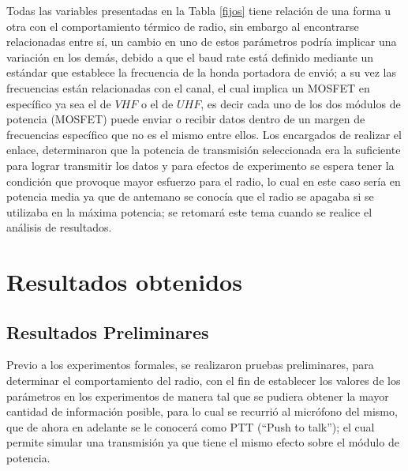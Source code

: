 Todas las variables presentadas en la Tabla \ref{fijos} tiene relación de una forma u otra con el comportamiento térmico de radio, sin embargo al encontrarse relacionadas entre sí, un cambio en uno de estos parámetros podría implicar una variación en los demás, debido a que el baud rate está definido mediante un estándar que establece la frecuencia de la honda portadora de envió; a su vez las frecuencias están relacionadas con el canal, el cual implica un MOSFET en específico ya sea el de $VHF$ o el de $UHF$, es decir cada uno de los dos módulos de potencia (MOSFET) puede enviar o recibir datos dentro de un margen de frecuencias específico que no es el mismo entre ellos. Los encargados de realizar el enlace, determinaron que la potencia de transmisión  seleccionada era la suficiente para lograr transmitir los datos y para efectos de experimento se espera tener la condición que provoque mayor esfuerzo para el radio, lo cual en este caso sería en potencia media ya que de antemano se conocía que el radio se apagaba si se utilizaba en la máxima potencia; se retomará este tema cuando se realice el análisis de resultados. 

\section{Resultados obtenidos}

\subsection{Resultados Preliminares}

Previo a los experimentos formales, se realizaron pruebas preliminares, para determinar el comportamiento del radio, con el fin de establecer los valores de los parámetros en los experimentos de manera tal que se pudiera obtener la mayor cantidad de información posible, para lo cual se recurrió al micrófono del mismo, que de ahora en adelante se le conocerá como PTT (``Push to talk''); el cual permite simular una transmisión ya que tiene el mismo efecto sobre el módulo de potencia.


